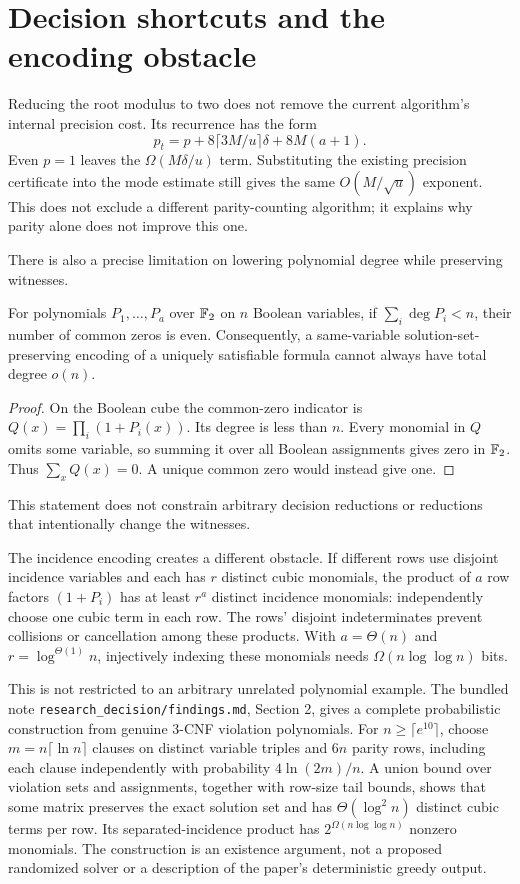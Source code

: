 \section{Decision shortcuts and the encoding obstacle}
Reducing the root modulus to two does not remove the current algorithm's internal precision cost. Its recurrence has the form
\[
 p_t=p+8\lceil3M/u\rceil\delta+8M(a+1).
\]
Even $p=1$ leaves the $\Omega(M\delta/u)$ term. Substituting the existing precision certificate into the mode estimate still gives the same $O(M/\sqrt u)$ exponent. This does not exclude a different parity-counting algorithm; it explains why parity alone does not improve this one.

There is also a precise limitation on lowering polynomial degree while preserving witnesses.
\begin{proposition}\label{prop:odd}
For polynomials $P_1,\ldots,P_a$ over $\mathbb F_2$ on $n$ Boolean variables, if $\sum_i\deg P_i<n$, their number of common zeros is even. Consequently, a same-variable solution-set-preserving encoding of a uniquely satisfiable formula cannot always have total degree $o(n)$.
\end{proposition}
\begin{proof}
On the Boolean cube the common-zero indicator is
$Q(x)=\prod_i(1+P_i(x))$. Its degree is less than $n$. Every monomial in $Q$ omits some variable, so summing it over all Boolean assignments gives zero in $\mathbb F_2$. Thus $\sum_xQ(x)=0$. A unique common zero would instead give one.
\end{proof}
This statement does not constrain arbitrary decision reductions or reductions that intentionally change the witnesses.

The incidence encoding creates a different obstacle. If different rows use disjoint incidence variables and each has $r$ distinct cubic monomials, the product of $a$ row factors $(1+P_i)$ has at least $r^a$ distinct incidence monomials: independently choose one cubic term in each row. The rows' disjoint indeterminates prevent collisions or cancellation among these products. With $a=\Theta(n)$ and $r=\log^{\Theta(1)}n$, injectively indexing these monomials needs $\Omega(n\log\log n)$ bits.

This is not restricted to an arbitrary unrelated polynomial example. The bundled note \texttt{research\_decision/findings.md}, Section 2, gives a complete probabilistic construction from genuine 3-CNF violation polynomials. For $n\ge\lceil e^{10}\rceil$, choose $m=n\lceil\ln n\rceil$ clauses on distinct variable triples and $6n$ parity rows, including each clause independently with probability $4\ln(2m)/n$. A union bound over violation sets and assignments, together with row-size tail bounds, shows that some matrix preserves the exact solution set and has $\Theta(\log^2 n)$ distinct cubic terms per row. Its separated-incidence product has $2^{\Omega(n\log\log n)}$ nonzero monomials. The construction is an existence argument, not a proposed randomized solver or a description of the paper's deterministic greedy output.

